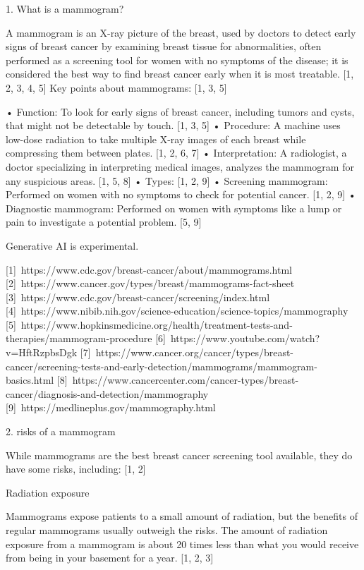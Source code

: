 1. What is a mammogram?

A mammogram is an X-ray picture of the breast, used by doctors to detect early signs of breast cancer by examining breast tissue for abnormalities, often performed as a screening tool for women with no symptoms of the disease; it is considered the best way to find breast cancer early when it is most treatable. [1, 2, 3, 4, 5]  
Key points about mammograms: [1, 3, 5]  

• Function: To look for early signs of breast cancer, including tumors and cysts, that might not be detectable by touch. [1, 3, 5]  
• Procedure: A machine uses low-dose radiation to take multiple X-ray images of each breast while compressing them between plates. [1, 2, 6, 7]  
• Interpretation: A radiologist, a doctor specializing in interpreting medical images, analyzes the mammogram for any suspicious areas. [1, 5, 8]  
• Types: [1, 2, 9]  
	• Screening mammogram: Performed on women with no symptoms to check for potential cancer. [1, 2, 9]  
	• Diagnostic mammogram: Performed on women with symptoms like a lump or pain to investigate a potential problem. [5, 9]  




Generative AI is experimental.

[1] https://www.cdc.gov/breast-cancer/about/mammograms.html
[2] https://www.cancer.gov/types/breast/mammograms-fact-sheet
[3] https://www.cdc.gov/breast-cancer/screening/index.html
[4] https://www.nibib.nih.gov/science-education/science-topics/mammography
[5] https://www.hopkinsmedicine.org/health/treatment-tests-and-therapies/mammogram-procedure
[6] https://www.youtube.com/watch?v=HftRzpbsDgk
[7] https://www.cancer.org/cancer/types/breast-cancer/screening-tests-and-early-detection/mammograms/mammogram-basics.html
[8] https://www.cancercenter.com/cancer-types/breast-cancer/diagnosis-and-detection/mammography
[9] https://medlineplus.gov/mammography.html



2. risks of a mammogram

While mammograms are the best breast cancer screening tool available, they do have some risks, including: [1, 2]  

Radiation exposure 

Mammograms expose patients to a small amount of radiation, but the benefits of regular mammograms usually outweigh the risks. The amount of radiation exposure from a mammogram is about 20 times less than what you would receive from being in your basement for a year. [1, 2, 3]  

